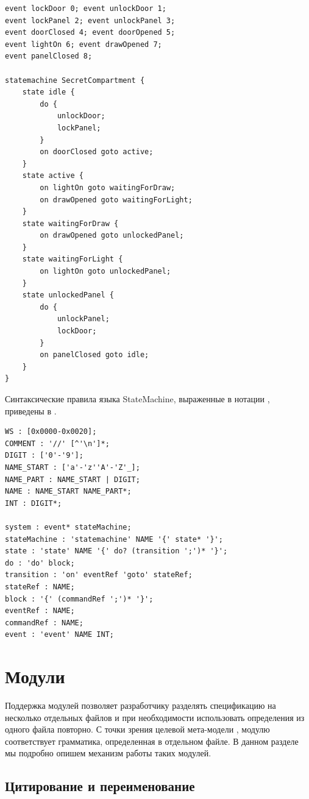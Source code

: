 \begin{lstlisting}[label=SMText,float=htbp,caption=Текстовая нотация языка StateMachine]
event lockDoor 0; event unlockDoor 1;
event lockPanel 2; event unlockPanel 3;
event doorClosed 4; event doorOpened 5;
event lightOn 6; event drawOpened 7;
event panelClosed 8;

statemachine SecretCompartment {
	state idle {
		do {
			unlockDoor;
			lockPanel;
		}
		on doorClosed goto active;
	}
	state active {
		on lightOn goto waitingForDraw;
		on drawOpened goto waitingForLight;
	}
	state waitingForDraw {
		on drawOpened goto unlockedPanel;
	}
	state waitingForLight {
		on lightOn goto unlockedPanel;
	}
	state unlockedPanel {
		do {
			unlockPanel;
			lockDoor;
		}
		on panelClosed goto idle;
	}
}
\end{lstlisting}

Синтаксические правила языка StateMachine, выраженные в нотации , приведены в .

\begin{lstlisting}[xleftmargin=1cm,float=htbp,label=SMGram,caption=Грамматика языка StateMachine]
WS : [0x0000-0x0020];
COMMENT : '//' [^'\n']*;
DIGIT : ['0'-'9'];
NAME_START : ['a'-'z''A'-'Z'_];
NAME_PART : NAME_START | DIGIT;
NAME : NAME_START NAME_PART*;
INT : DIGIT*;

system : event* stateMachine;
stateMachine : 'statemachine' NAME '{' state* '}';
state : 'state' NAME '{' do? (transition ';')* '}';
do : 'do' block;
transition : 'on' eventRef 'goto' stateRef;
stateRef : NAME;
block : '{' (commandRef ';')* '}';
eventRef : NAME;
commandRef : NAME;
event : 'event' NAME INT;
\end{lstlisting}

\chapter{Модули}

Поддержка модулей позволяет разработчику разделять спецификацию на несколько отдельных файлов и при необходимости использовать определения из одного файла повторно.  С точки зрения целевой мета-модели , модулю соответствует грамматика, определенная в отдельном файле. В данном разделе мы подробно опишем механизм работы таких модулей.

\section{Цитирование и переименование}

